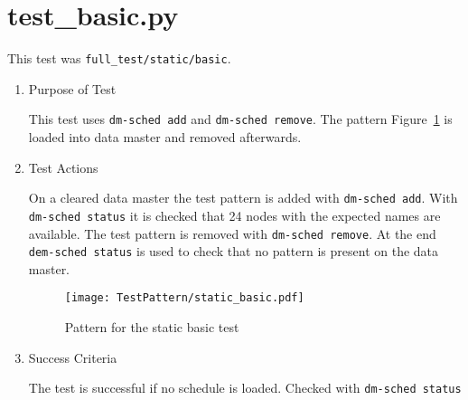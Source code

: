 \documentclass[12pt,a4paper]{report}
\begin{document}
\section{test\_basic.py}
This test was \texttt{full\_test/static/basic}.
\begin{enumerate}
	\item Purpose of Test

	This test uses \texttt{dm-sched add} and \texttt{dm-sched remove}. The pattern Figure~\ref{fig:Pattern_for_the_static_basic_test}
	is loaded into data master and removed afterwards.

	\item Test Actions

	On a cleared data master the test pattern is added with \texttt{dm-sched add}. With \texttt{dm-sched status} it is checked
	that 24 nodes with the expected names are available. The test pattern is removed with \texttt{dm-sched remove}. At the
	end \texttt{dem-sched status} is used to check that no pattern is present on the data master.

    \begin{figure}
        \centering
        \texttt{[image: TestPattern/static\_basic.pdf]}
        \caption{Pattern for the static basic test}
        \label{fig:Pattern_for_the_static_basic_test}
    \end{figure}
	\item Success Criteria

	The test is successful if no schedule is loaded. Checked with \texttt{dm-sched status}
\end{enumerate}
\end{document}
